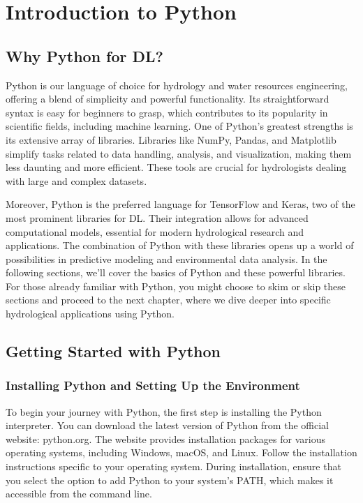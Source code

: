\chapter{Introduction to Python}
\section{Why Python for DL?}
Python is our language of choice for hydrology and water resources engineering, offering a blend of simplicity and powerful functionality. Its straightforward syntax is easy for beginners to grasp, which contributes to its popularity in scientific fields, including machine learning. One of Python's greatest strengths is its extensive array of libraries. Libraries like NumPy, Pandas, and Matplotlib simplify tasks related to data handling, analysis, and visualization, making them less daunting and more efficient. These tools are crucial for hydrologists dealing with large and complex datasets.

Moreover, Python is the preferred language for TensorFlow and Keras, two of the most prominent libraries for DL. Their integration allows for advanced computational models, essential for modern hydrological research and applications. The combination of Python with these libraries opens up a world of possibilities in predictive modeling and environmental data analysis. In the following sections, we'll cover the basics of Python and these powerful libraries. For those already familiar with Python, you might choose to skim or skip these sections and proceed to the next chapter, where we dive deeper into specific hydrological applications using Python.

\section{Getting Started with Python}
\subsection{Installing Python and Setting Up the Environment}
To begin your journey with Python, the first step is installing the Python interpreter. You can download the latest version of Python from the official website: python.org. The website provides installation packages for various operating systems, including Windows, macOS, and Linux. Follow the installation instructions specific to your operating system. During installation, ensure that you select the option to add Python to your system's PATH, which makes it accessible from the command line.

